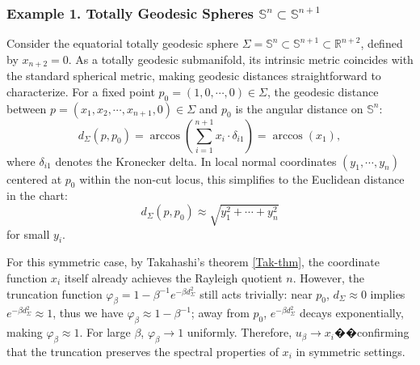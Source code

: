 \documentclass[a4, 12pt]{amsart}
\numberwithin{equation}{section} \numberwithin{equation}{section}
\begin{document}
\subsubsection{Example 1. Totally Geodesic Spheres $\mathbb{S}^n \subset \mathbb{S}^{n+1}$}
Consider the equatorial totally geodesic sphere $\Sigma = \mathbb{S}^n \subset \mathbb{S}^{n+1} \subset \mathbb{R}^{n+2}$, defined by $x_{n+2} = 0$. As a totally geodesic submanifold, its intrinsic metric coincides with the standard spherical metric, making geodesic distances straightforward to characterize. For a fixed point $p_0 = (1, 0, \cdots, 0) \in \Sigma$, the geodesic distance between $p = (x_1, x_2, \cdots, x_{n+1}, 0) \in \Sigma$ and $p_0$ is the angular distance on $\mathbb{S}^n$:
\begin{equation*}
d_\Sigma(p, p_0) = \arccos\left(\sum_{i=1}^{n+1} x_i \cdot \delta_{i1}\right) = \arccos(x_1),
\end{equation*}
where $\delta_{i1}$ denotes the Kronecker delta. In local normal coordinates $(y_1, \cdots, y_n)$ centered at $p_0$ within the non-cut locus, this simplifies to the Euclidean distance in the chart:
\begin{equation*}
d_\Sigma(p, p_0) \approx \sqrt{y_1^2 + \cdots + y_n^2}
\end{equation*}
for small $y_i$.

For this symmetric case, by Takahashi's theorem \ref{Tak-thm}, the coordinate function $x_i$ itself already achieves the Rayleigh quotient $n$. However, the truncation function $\varphi_\beta = 1 - \beta^{-1}e^{-\beta d_\Sigma^2}$ still acts trivially: near $p_0$, $d_\Sigma \approx 0$ implies $e^{-\beta d_\Sigma^2} \approx 1$, thus we have $\varphi_\beta \approx 1 - \beta^{-1}$; away from $p_0$, $e^{-\beta d_\Sigma^2}$ decays exponentially, making $\varphi_\beta \approx 1$. For large $\beta$, $\varphi_\beta \to 1$ uniformly. Therefore, $u_\beta \to x_i$��confirming that the truncation preserves the spectral properties of $x_i$ in symmetric settings.
\end{document}
